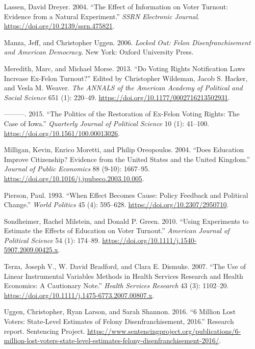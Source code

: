 \documentclass[
  12pt,
]{article}
\newlength{\cslhangindent}
\newenvironment{cslreferences}%
  {\setlength{\parindent}{0pt}%
  \everypar{\setlength{\hangindent}{\cslhangindent}}\ignorespaces}%
  {\par}
\begin{document}
\begin{cslreferences}
\leavevmode\hypertarget{ref-Lassen2004}{}%
Lassen, David Dreyer. 2004. ``The Effect of Information on Voter Turnout: Evidence from a Natural Experiment.'' \emph{SSRN Electronic Journal}. \url{https://doi.org/10.2139/ssrn.475821}.

\leavevmode\hypertarget{ref-locked_out}{}%
Manza, Jeff, and Christopher Uggen. 2006. \emph{Locked Out: Felon Disenfranchisement and American Democracy}. New York: Oxford University Press.

\leavevmode\hypertarget{ref-Meredith2013}{}%
Meredith, Marc, and Michael Morse. 2013. ``Do Voting Rights Notification Laws Increase Ex-Felon Turnout?'' Edited by Christopher Wildeman, Jacob S. Hacker, and Vesla M. Weaver. \emph{The ANNALS of the American Academy of Political and Social Science} 651 (1): 220--49. \url{https://doi.org/10.1177/0002716213502931}.

\leavevmode\hypertarget{ref-Meredith2015}{}%
---------. 2015. ``The Politics of the Restoration of Ex-Felon Voting Rights: The Case of Iowa.'' \emph{Quarterly Journal of Political Science} 10 (1): 41--100. \url{https://doi.org/10.1561/100.00013026}.

\leavevmode\hypertarget{ref-Milligan2004}{}%
Milligan, Kevin, Enrico Moretti, and Philip Oreopoulos. 2004. ``Does Education Improve Citizenship? Evidence from the United States and the United Kingdom.'' \emph{Journal of Public Economics} 88 (9-10): 1667--95. \url{https://doi.org/10.1016/j.jpubeco.2003.10.005}.

\leavevmode\hypertarget{ref-Pierson1993}{}%
Pierson, Paul. 1993. ``When Effect Becomes Cause: Policy Feedback and Political Change.'' \emph{World Politics} 45 (4): 595--628. \url{https://doi.org/10.2307/2950710}.

\leavevmode\hypertarget{ref-Sondheimer2010}{}%
Sondheimer, Rachel Milstein, and Donald P. Green. 2010. ``Using Experiments to Estimate the Effects of Education on Voter Turnout.'' \emph{American Journal of Political Science} 54 (1): 174--89. \url{https://doi.org/10.1111/j.1540-5907.2009.00425.x}.

\leavevmode\hypertarget{ref-Terza2007}{}%
Terza, Joseph V., W. David Bradford, and Clara E. Dismuke. 2007. ``The Use of Linear Instrumental Variables Methods in Health Services Research and Health Economics: A Cautionary Note.'' \emph{Health Services Research} 43 (3): 1102--20. \url{https://doi.org/10.1111/j.1475-6773.2007.00807.x}.

\leavevmode\hypertarget{ref-sentencing_2016}{}%
Uggen, Christopher, Ryan Larson, and Sarah Shannon. 2016. ``6 Million Lost Voters: State-Level Estimates of Felony Disenfranchisement, 2016.'' Research report. Sentencing Project. \url{https://www.sentencingproject.org/publications/6-million-lost-voters-state-level-estimates-felony-disenfranchisement-2016/}.


\end{cslreferences}
\end{document}
